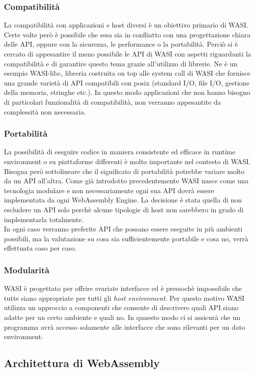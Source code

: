 \subsubsection{Compatibilità}
La compatibilità con applicazioni e host diversi è un obiettivo primario di WASI. Certe volte però è possibile che essa sia in confliatto con una progettazione chiara delle API, oppure con la sicurezza, le performance o la portabilità.
Perciò si è cercato di appesantire il meno possibile le API di WASI con aspetti riguardanti la compatibilità e di garantire questo tema grazie all'utilizzo di librerie. Ne è un esempio WASI-libc, libreria costruita on top alle system call di WASI che fornisce una grande varietà di API compatibili con posix (standard I/O, file I/O, gestione della memoria, stringhe etc.).
In questo modo applicazioni che non hanno bisogno di particolari funzionalità di compatibilità, non verranno appesantite da complessità non necessaria.
\subsubsection{Portabilità}
La possibilità di eseguire codice in maniera consistente ed efficace in runtime environment o su piattaforme differenti è molto importante nel contesto di WASI. Bisogna però sottolineare che il significato di portabilità potrebbe variare molto da un API all'altra. Come già introdotto precedentemente WASI nasce come una tecnologia modulare e non necessariamente ogni sua API dovrà essere implementata da ogni WebAssembly Engine.
La decisione è stata quella di non escludere un API solo perchè alcune tipologie di host non sarebbero in grado di implementarla totalmente.
\\In ogni caso verranno preferite API che possano essere eseguite in più ambienti possibili, ma la valutazione su cosa sia sufficientemente portabile e cosa no, verrà effettuata caso per caso.
\subsubsection{Modularità}
WASI è progettato per offrire svariate interfacce ed è pressochè impossibile che tutte siano appropriate per tutti gli \emph{host environment}. Per questo motivo WASI utilizza un approccio a componenti che consente di descrivere quali API siano adatte per un certo ambiente e quali no. In quaesto modo ci si assicurà che un programma avrà accesso solamente alle interfacce che sono rilevanti per un dato environment.
\subsection{Architettura di WebAssembly}

